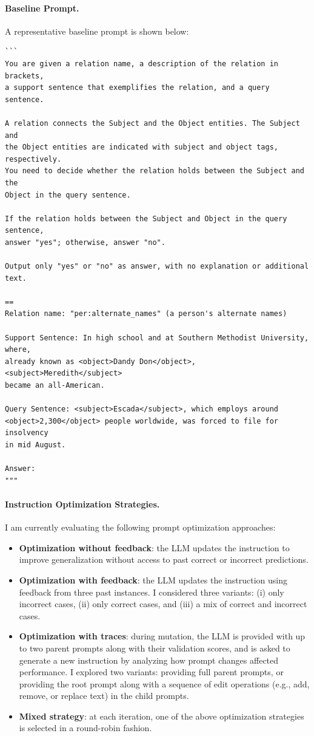 \documentclass[12pt]{article}
\begin{document}
\paragraph{Baseline Prompt.}
A representative baseline prompt is shown below:
\begin{verbatim}
```
You are given a relation name, a description of the relation in brackets,
a support sentence that exemplifies the relation, and a query sentence.

A relation connects the Subject and the Object entities. The Subject and
the Object entities are indicated with subject and object tags, respectively.
You need to decide whether the relation holds between the Subject and the
Object in the query sentence.

If the relation holds between the Subject and Object in the query sentence,
answer "yes"; otherwise, answer "no".

Output only "yes" or "no" as answer, with no explanation or additional text.

==
Relation name: "per:alternate_names" (a person's alternate names)

Support Sentence: In high school and at Southern Methodist University, where,
already known as <object>Dandy Don</object>, <subject>Meredith</subject>
became an all-American.

Query Sentence: <subject>Escada</subject>, which employs around
<object>2,300</object> people worldwide, was forced to file for insolvency
in mid August.

Answer: 
"""
\end{verbatim}

\paragraph{Instruction Optimization Strategies.}
I am currently evaluating the following prompt optimization approaches:
\begin{itemize}
    \item \textbf{Optimization without feedback}: the LLM updates the instruction to improve generalization without access to past correct or incorrect predictions.
    \item \textbf{Optimization with feedback}: the LLM updates the instruction using feedback from three past instances. I considered three variants:
    (i) only incorrect cases, (ii) only correct cases, and (iii) a mix of correct and incorrect cases.
    \item \textbf{Optimization with traces}: during mutation, the LLM is provided with up to two parent prompts along with their validation scores, and is asked to generate a new instruction by analyzing how prompt changes affected performance.
    I explored two variants: providing full parent prompts, or providing the root prompt along with a sequence of edit operations (e.g., add, remove, or replace text) in the child prompts.
    \item \textbf{Mixed strategy}: at each iteration, one of the above optimization strategies is selected in a round-robin fashion.
\end{itemize}
\end{document}
